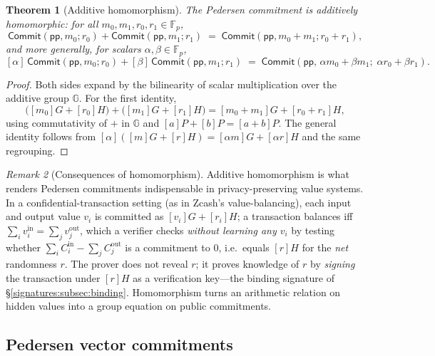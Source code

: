\documentclass[11pt,a4paper]{article}
\newtheorem{theorem}{Theorem}[section]
\theoremstyle{definition}
\theoremstyle{remark}
\newtheorem{remark}[theorem]{Remark}
\newcommand{\G}{\ensuremath{\mathbb{G}}}
\newcommand{\Fp}{\ensuremath{\mathbb{F}_{p}}}
\begin{document}
\begin{theorem}[Additive homomorphism]\label{commitments:thm:pedersen-homo}
The Pedersen commitment is additively homomorphic: for all \(m_0, m_1, r_0, r_1 \in \Fp\),
\[
  \mathsf{Commit}(\mathsf{pp}, m_0; r_0) + \mathsf{Commit}(\mathsf{pp}, m_1; r_1)
  \;=\; \mathsf{Commit}(\mathsf{pp}, m_0 + m_1; r_0 + r_1),
\]
and more generally, for scalars \(\alpha, \beta \in \Fp\),
\[
  [\alpha]\,\mathsf{Commit}(\mathsf{pp}, m_0; r_0) + [\beta]\,\mathsf{Commit}(\mathsf{pp}, m_1; r_1)
  \;=\; \mathsf{Commit}(\mathsf{pp},\, \alpha m_0 + \beta m_1;\; \alpha r_0 + \beta r_1).
\]
\end{theorem}

\begin{proof}
Both sides expand by the bilinearity of scalar multiplication over the additive group \(\G\). For the first identity,
\[
  \bigl([m_0]G + [r_0]H\bigr) + \bigl([m_1]G + [r_1]H\bigr)
  = [m_0 + m_1]G + [r_0 + r_1]H,
\]
using commutativity of \(+\) in \(\G\) and \([a]P + [b]P = [a+b]P\). The general identity follows from \([\alpha]([m]G + [r]H) = [\alpha m]G + [\alpha r]H\) and the same regrouping.
\end{proof}

\begin{remark}[Consequences of homomorphism]\label{commitments:rem:homo-uses}
Additive homomorphism is what renders Pedersen commitments indispensable in privacy-preserving value systems. In a confidential-transaction setting (as in Zcash's value-balancing), each input and output value \(v_i\) is committed as \([v_i]G + [r_i]H\); a transaction balances iff \(\sum_i v_i^{\text{in}} = \sum_j v_j^{\text{out}}\), which a verifier checks \emph{without learning any \(v_i\)} by testing whether \(\sum_i C_i^{\text{in}} - \sum_j C_j^{\text{out}}\) is a commitment to \(0\), i.e.\ equals \([r]H\) for the \emph{net} randomness \(r\). The prover does not reveal \(r\); it proves knowledge of \(r\) by \emph{signing} the transaction under \([r]H\) as a verification key---the binding signature of \S\ref{signatures:subsec:binding}. Homomorphism turns an arithmetic relation on hidden values into a group equation on public commitments.
\end{remark}

\subsection{Pedersen vector commitments}\label{commitments:subsec:pedersen-vector}
\end{document}
